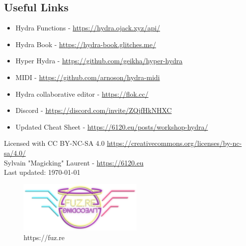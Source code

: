 \documentclass[9pt,oneside]{amsart}
\begin{document}
\subsection*{Useful Links}
\begin{itemize}
\item Hydra Functions - \url{https://hydra.ojack.xyz/api/}
\item Hydra Book - \url{https://hydra-book.glitches.me/}
\item Hyper Hydra - \url{https://github.com/geikha/hyper-hydra}
\item MIDI - \url{https://github.com/arnoson/hydra-midi}
\item Hydra collaborative editor - \url{https://flok.cc/}
\item Discord - \url{https://discord.com/invite/ZQjfHkNHXC}
\item Updated Cheat Sheet - \url{https://6120.eu/posts/workshop-hydra/}
\end{itemize}
\vspace{2cm}
Licensed with CC BY-NC-SA 4.0 \url{https://creativecommons.org/licenses/by-nc-sa/4.0/} \\
Sylvain "Magicking" Laurent - \url{https://6120.eu} \\
Last updated: \today\\

\begin{figure}
    \includegraphics[height=25mm]{fuzrelivecoding.png}
    \caption{https://fuz.re}
    \label{fig:wrapfig}
    \end{figure}
\end{document}
